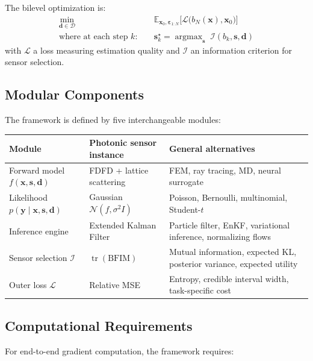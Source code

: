 \documentclass[11pt,a4paper]{article}
\newcommand{\tr}{\operatorname{tr}}
\newcommand{\argmax}{\operatorname{argmax}}
\begin{document}
The bilevel optimization is:
\begin{align}
  \min_{\bm{d} \in \mathcal{D}} \quad & \mathbb{E}_{\bm{x}_0, \bm{\varepsilon}_{1:N}} \Big[ \mathcal{L}\big(b_N(\bm{x}), \bm{x}_0\big) \Big] \label{eq:outer} \\
  \text{where at each step } k: \quad & \bm{s}_k^\star = \argmax_{\bm{s}} \; \mathcal{I}(b_k, \bm{s}, \bm{d}) \label{eq:inner}
\end{align}
with $\mathcal{L}$ a loss measuring estimation quality and $\mathcal{I}$ an information criterion for sensor selection.

\subsection{Modular Components}

The framework is defined by five interchangeable modules:

\begin{center}
\renewcommand{\arraystretch}{1.3}
\begin{tabular}{@{}p{3.5cm}p{4cm}p{6cm}@{}}
\toprule
\textbf{Module} & \textbf{Photonic sensor instance} & \textbf{General alternatives} \\
\midrule
Forward model $f(\bm{x}, \bm{s}, \bm{d})$ & FDFD + lattice scattering & FEM, ray tracing, MD, neural surrogate \\
Likelihood $p(\bm{y} \mid \bm{x}, \bm{s}, \bm{d})$ & Gaussian $\mathcal{N}(f, \sigma^2 I)$ & Poisson, Bernoulli, multinomial, Student-$t$ \\
Inference engine & Extended Kalman Filter & Particle filter, EnKF, variational inference, normalizing flows \\
Sensor selection $\mathcal{I}$ & $\tr(\text{BFIM})$ & Mutual information, expected KL, posterior variance, expected utility \\
Outer loss $\mathcal{L}$ & Relative MSE & Entropy, credible interval width, task-specific cost \\
\bottomrule
\end{tabular}
\end{center}

\subsection{Computational Requirements}

For end-to-end gradient computation, the framework requires:
\end{document}
